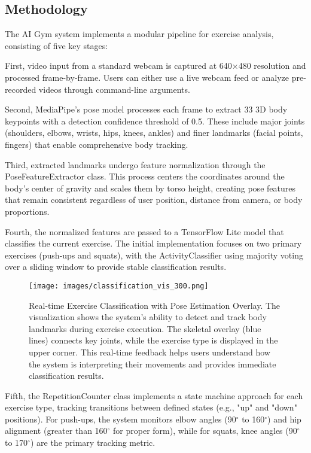 \documentclass[11pt]{article}
\begin{document}
\subsection{Methodology}
The AI Gym system implements a modular pipeline for exercise analysis, consisting of five key stages:

First, video input from a standard webcam is captured at 640×480 resolution and processed frame-by-frame. Users can either use a live webcam feed or analyze pre-recorded videos through command-line arguments.

Second, MediaPipe's pose model processes each frame to extract 33 3D body keypoints with a detection confidence threshold of 0.5. These include major joints (shoulders, elbows, wrists, hips, knees, ankles) and finer landmarks (facial points, fingers) that enable comprehensive body tracking.

Third, extracted landmarks undergo feature normalization through the PoseFeatureExtractor class. This process centers the coordinates around the body's center of gravity and scales them by torso height, creating pose features that remain consistent regardless of user position, distance from camera, or body proportions.

Fourth, the normalized features are passed to a TensorFlow Lite model that classifies the current exercise. The initial implementation focuses on two primary exercises (push-ups and squats), with the ActivityClassifier using majority voting over a sliding window to provide stable classification results.
\begin{figure}[htbp]
    
\end{figure}

\begin{figure}[htbp]
    \centering
    \texttt{[image: images/classification\_vis\_300.png]}
    \caption{Real-time Exercise Classification with Pose Estimation Overlay. The visualization shows the system's ability to detect and track body landmarks during exercise execution. The skeletal overlay (blue lines) connects key joints, while the exercise type is displayed in the upper corner. This real-time feedback helps users understand how the system is interpreting their movements and provides immediate classification results.}
    \label{fig:classification_vis}
\end{figure}

Fifth, the RepetitionCounter class implements a state machine approach for each exercise type, tracking transitions between defined states (e.g., "up" and "down" positions). For push-ups, the system monitors elbow angles (90$^\circ$ to 160$^\circ$) and hip alignment (greater than 160$^\circ$ for proper form), while for squats, knee angles (90$^\circ$ to 170$^\circ$) are the primary tracking metric.
\end{document}
